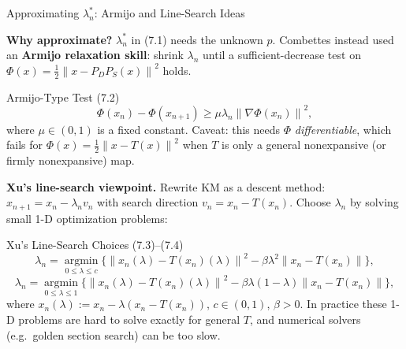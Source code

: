 \documentclass[aspectratio=169,10pt]{beamer}
\newcommand{\norm}[1]{\left\|#1\right\|}
\begin{document}
\begin{frame}{Approximating $\lambda_n^*$: Armijo and Line-Search Ideas}

  \textbf{Why approximate?} $\lambda_n^*$ in (7.1) needs the unknown
  $p$. Combettes instead used an \textbf{Armijo relaxation skill}:
  shrink $\lambda_n$ until a sufficient-decrease test on
  $\Phi(x)=\tfrac12\norm{x-P_DP_S(x)}^2$ holds.

  \begin{block}{Armijo-Type Test (7.2)}
    \[
      \Phi(x_n)-\Phi(x_{n+1}) \ge \mu\lambda_n\norm{\nabla\Phi(x_n)}^2,
    \]
    where $\mu\in(0,1)$ is a fixed constant. Caveat: this needs
    $\Phi$ \emph{differentiable}, which fails for
    $\Phi(x)=\tfrac12\norm{x-T(x)}^2$ when $T$ is only a general
    nonexpansive (or firmly nonexpansive) map.
  \end{block}

  \textbf{Xu's line-search viewpoint.} Rewrite KM as a descent
  method: $x_{n+1}=x_n-\lambda_n v_n$ with search direction
  $v_n=x_n-T(x_n)$. Choose $\lambda_n$ by solving small 1-D
  optimization problems:
  \begin{block}{Xu's Line-Search Choices (7.3)--(7.4)}
    \[
      \lambda_n = \operatorname*{argmin}_{0\le\lambda\le c}
        \bigl\{\norm{x_n(\lambda)-T(x_n)(\lambda)}^2
               -\beta\lambda^2\norm{x_n-T(x_n)}\bigr\},
    \]
    \[
      \lambda_n = \operatorname*{argmin}_{0\le\lambda\le1}
        \bigl\{\norm{x_n(\lambda)-T(x_n)(\lambda)}^2
               -\beta\lambda(1-\lambda)\norm{x_n-T(x_n)}\bigr\},
    \]
    where $x_n(\lambda):=x_n-\lambda(x_n-T(x_n))$, $c\in(0,1)$,
    $\beta>0$. In practice these 1-D problems are hard to solve
    exactly for general $T$, and numerical solvers (e.g.\ golden
    section search) can be too slow.
  \end{block}

\end{frame}
\end{document}
